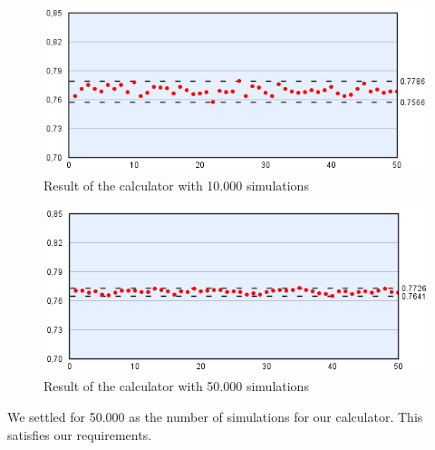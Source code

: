 \begin{figure}[H]
  \center
    \includegraphics[scale=0.775]{images/MonteCarlo/10k.png}
  \caption{Result of the calculator with 10.000 simulations \label{fig:mc10}}
\end{figure}

\begin{figure}[H]
  \center
    \includegraphics[scale=0.775]{images/MonteCarlo/50k.png}
  \caption{Result of the calculator with 50.000 simulations \label{fig:mc50}}
\end{figure}

We settled for 50.000 as the number of simulations for our calculator. This satisfies our requirements.


